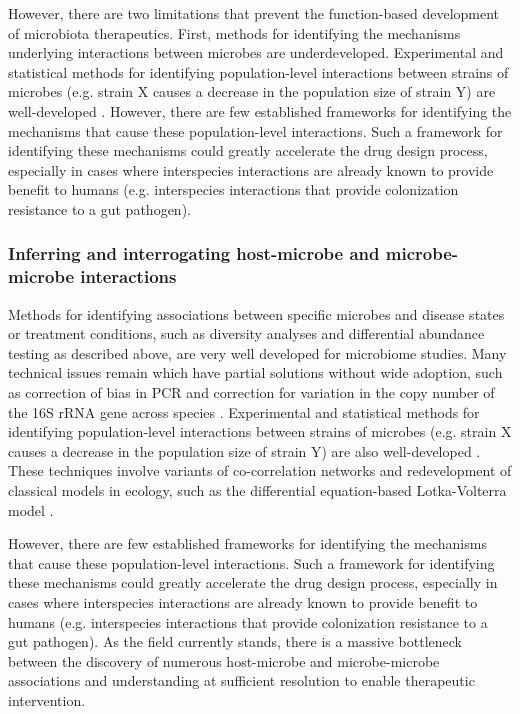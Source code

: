 \documentclass[11pt,twocolumn,notitlepage,openany,twoside]{book}
\begin{document}
\begin{refsection}
However, there are two limitations that prevent the function-based development of microbiota therapeutics. First, methods for identifying the mechanisms underlying interactions between microbes are underdeveloped. Experimental and statistical methods for identifying population-level interactions between strains of microbes (e.g. strain X causes a decrease in the population size of strain Y) are well-developed \cite{Gilbert2016-oe}. However, there are few established frameworks for identifying the mechanisms that cause these population-level interactions. Such a framework for identifying these mechanisms could greatly accelerate the drug design process, especially in cases where interspecies interactions are already known to provide benefit to humans (e.g. interspecies interactions that provide colonization resistance to a gut pathogen).

\subsubsection{Inferring and interrogating host-microbe and microbe-microbe interactions}

Methods for identifying associations between specific microbes and disease states or treatment conditions, such as diversity analyses and differential abundance testing as described above, are very well developed for microbiome studies. Many technical issues remain which have partial solutions without wide adoption, such as correction of bias in PCR \cite{Kennedy2014-zh} and correction for variation in the copy number of the 16S rRNA gene across species \cite{Kembel2012-za}.  Experimental and statistical methods for identifying population-level interactions between strains of microbes (e.g. strain X causes a decrease in the population size of strain Y) are also well-developed \cite{Gilbert2016-oe}. These techniques involve variants of co-correlation networks and redevelopment of classical models in ecology, such as the differential equation-based Lotka-Volterra model \cite{Succurro2018-qv}.

However, there are few established frameworks for identifying the mechanisms that cause these population-level interactions. Such a framework for identifying these mechanisms could greatly accelerate the drug design process, especially in cases where interspecies interactions are already known to provide benefit to humans (e.g. interspecies interactions that provide colonization resistance to a gut pathogen). As the field currently stands, there is a massive bottleneck between the discovery of numerous host-microbe and microbe-microbe associations and understanding at sufficient resolution to enable therapeutic intervention.


\end{refsection}
\end{document}

